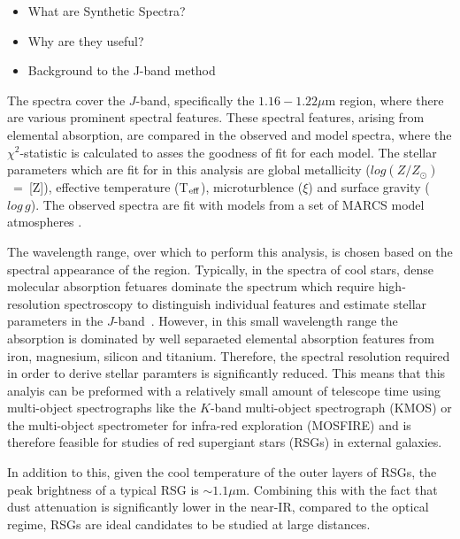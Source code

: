 \begin{itemize}
    \item What are Synthetic Spectra?
    \item Why are they useful?
    \item Background to the J-band method
\end{itemize}

The spectra cover the $J$-band, specifically the $1.16-1.22\mu$m region, where there are various prominent spectral features.
These spectral features, arising from elemental absorption, are compared in the observed and model spectra,
where the $\chi^{2}$-statistic is calculated to asses the goodness of fit for each model.
The stellar parameters which are fit for in this analysis are global metallicity ($log (Z/Z_{\odot})$~=~[Z]), effective temperature (T$_{\rm eff}$), microturblence ($\xi$) and surface gravity ($log\,g$).
The observed spectra are fit with models from a set of MARCS model atmospheres
\citep{2008A&A...486..951G}.

The wavelength range, over which to perform this analysis,
is chosen based on the spectral appearance of the region.
Typically, in the spectra of cool stars, dense molecular absorption fetuares dominate the spectrum which require high-resolution spectroscopy to distinguish individual features and estimate stellar parameters in the $J$-band~\citep{Cunha07, Davies09a, Davies09b}.
However, in this small wavelength range the absorption is dominated by well separaeted elemental absorption features from iron, magnesium, silicon and titanium.
Therefore, the spectral resolution required in order to derive stellar paramters is significantly reduced.
This means that this analyis can be preformed with a relatively small amount of telescope time using multi-object spectrographs like the $K$-band multi-object spectrograph (KMOS)
or the multi-object spectrometer for infra-red exploration (MOSFIRE) and is therefore feasible for studies of red supergiant stars (RSGs) in external galaxies.

In addition to this, given the cool temperature of the outer layers of RSGs,
the peak brightness of a typical RSG is $\sim1.1\mu$m.
Combining this with the fact that dust attenuation is significantly lower in the near-IR, compared to the optical regime, RSGs are ideal candidates to be studied at large distances.

